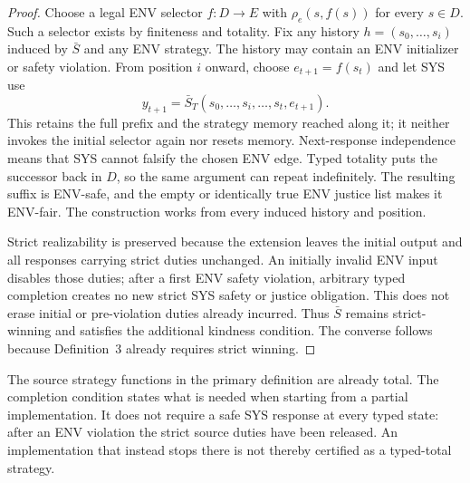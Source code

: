 \begin{proof}
Choose a legal ENV selector $f:D\to E$ with
$\rho_e(s,f(s))$ for every $s\in D$. Such a selector exists by finiteness
and totality. Fix any history $h=(s_0,\ldots,s_i)$ induced by $\bar S$
and any ENV strategy. The history may contain an ENV initializer or
safety violation. From position $i$ onward, choose
$e_{t+1}=f(s_t)$ and let SYS use
\[
 y_{t+1}=\bar S_T(s_0,\ldots,s_i,\ldots,s_t,e_{t+1}).
\]
This retains the full prefix and the strategy memory reached along it;
it neither invokes the initial selector again nor resets memory.
Next-response independence means that SYS cannot falsify the chosen
ENV edge. Typed totality puts the successor back in $D$, so the same
argument can repeat indefinitely. The resulting suffix is ENV-safe,
and the empty or identically true ENV justice list makes it ENV-fair.
The construction works from every induced history and position.

Strict realizability is preserved because the extension leaves the
initial output and all responses carrying strict duties unchanged.
An initially invalid ENV input disables those duties; after a first
ENV safety violation, arbitrary typed completion creates no new strict
SYS safety or justice obligation. This does not erase initial or
pre-violation duties already incurred. Thus $\bar S$ remains strict-winning
and satisfies the additional kindness condition. The converse follows
because Definition~3 already requires strict winning.
\end{proof}

The source strategy functions in the primary definition are already
total. The completion condition states what is needed when starting
from a partial implementation. It does not require a safe SYS response
at every typed state: after an ENV violation the strict source duties
have been released. An implementation that instead stops there is not
thereby certified as a typed-total strategy.

